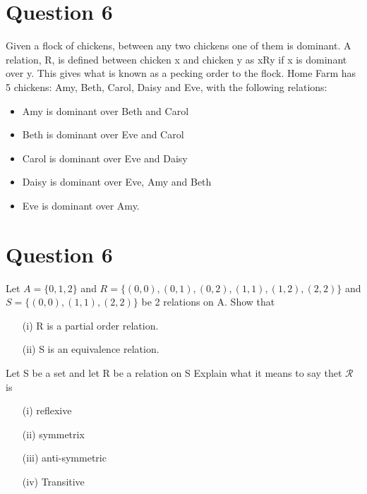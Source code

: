 \documentclass[]{report}
\begin{document}
{{{{{{%
\newpage
\section*{Question 6}
Given a flock of chickens, between any two chickens one of them is
dominant. A relation, R, is defined between chicken x and chicken y as xRy if x is
dominant over y. This gives what is known as a pecking order to the flock. Home
Farm has 5 chickens: Amy, Beth, Carol, Daisy and Eve, with the following relations:

\begin{itemize}
\item Amy is dominant over Beth and Carol
\item Beth is dominant over Eve and Carol
\item Carol is dominant over Eve and Daisy
\item Daisy is dominant over Eve, Amy and Beth
\item Eve is dominant over Amy.
\end{itemize}

\newpage
\section*{Question 6}

Let $A=\{0,1,2\}$ and $R=\{ (0,0),(0,1),(0,2),(1,1), (1,2), (2,2)\}$
and $S=\{(0,0),(1,1),(2,2)\}$ be 2 relations on A. Show that

\begin{itemize}
\item[(i)] R is a partial order relation.
\item[(ii)] S is an equivalence relation.
\end{itemize}

Let S be a set and let R be a relation on S
Explain what it means to say thet $\mathcal{R}$ is

\begin{itemize}
\item[(i)] reflexive
\item[(ii)] symmetrix
\item[(iii)] anti-symmetric
\item[(iv)] Transitive




\end{itemize}}}}}}}
\end{document}
